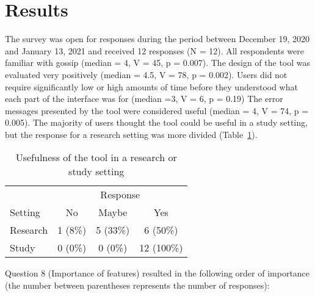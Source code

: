 
\section{Results}

The survey was open for responses during the period between December 19, 2020 and January 13, 2021 and received 12 responses (N = 12).
All respondents were familiar with gossip (median = 4, V = 45, p = 0.007). 
The design of the tool was evaluated very positively (median = 4.5, V = 78, p = 0.002).
Users did not require significantly low or high amounts of time before they understood what each part of the interface was for (median =3, V = 6, p = 0.19)
The error messages presented by the tool were considered useful (median = 4, V = 74, p = 0.005).
The majority of users thought the tool could be useful in a study setting, but the response for a research setting was more divided (Table~\ref{tab:setting-usefulness}).

\begin{table}[htb!]
    \centering
    \caption{Usefulness of the tool in a research or study setting}
    \label{tab:setting-usefulness}
    \begin{tabular}{lccc}
        \toprule
                    & \multicolumn{3}{c}{Response}          \\\cmidrule{2-4}
        Setting     & No        & Maybe     & Yes           \\
        \midrule
        Research    & 1 (8\%)   & 5 (33\%)  & 6 (50\%)      \\
        Study       & 0 (0\%)   & 0 (0\%)   & 12 (100\%)    \\
        \bottomrule
    \end{tabular}
\end{table}

Question 8 (Importance of features) resulted in the following order of importance (the number between parentheses represents the number of responses):

